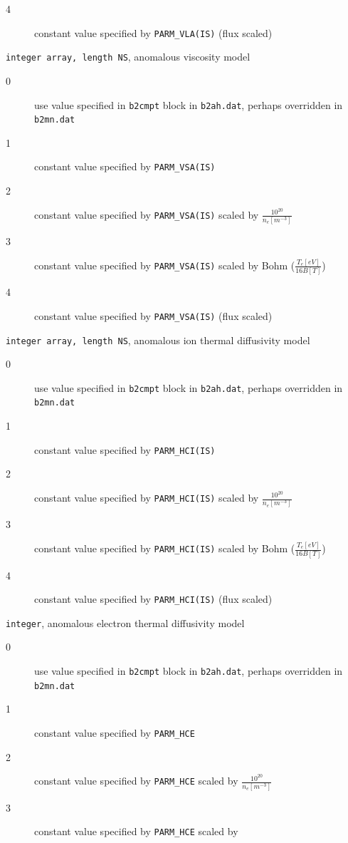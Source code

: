\documentclass[a4paper,10pt]{report}
\begin{document}
\begin{description}
\begin{description}
  \item[4] constant value specified by {\tt PARM\_VLA(IS)} (flux scaled)
  \end{description}
\item[FLAG\_VSA] {\tt integer array, length NS}, anomalous viscosity model
  \begin{description}
  \item[0] use value specified in {\tt b2cmpt} block in
  {\tt b2ah.dat}, perhaps overridden in {\tt b2mn.dat}
  \item[1] constant value specified by {\tt PARM\_VSA(IS)}
  \item[2] constant value specified by {\tt PARM\_VSA(IS)} scaled by
  $\frac{10^{20}}{n_e [m^{-3}]}$
  \item[3] constant value specified by {\tt PARM\_VSA(IS)} scaled by
  Bohm ($\frac{T_e [eV]}{16 B [T]}$)
  \item[4] constant value specified by {\tt PARM\_VSA(IS)} (flux scaled)
  \end{description}
\item[FLAG\_HCI] {\tt integer array, length NS}, anomalous ion thermal diffusivity model
  \begin{description}
  \item[0] use value specified in {\tt b2cmpt} block in
  {\tt b2ah.dat}, perhaps overridden in {\tt b2mn.dat}
  \item[1] constant value specified by {\tt PARM\_HCI(IS)}
  \item[2] constant value specified by {\tt PARM\_HCI(IS)} scaled by
  $\frac{10^{20}}{n_e [m^{-3}]}$
  \item[3] constant value specified by {\tt PARM\_HCI(IS)} scaled by
  Bohm ($\frac{T_e [eV]}{16 B [T]}$)
  \item[4] constant value specified by {\tt PARM\_HCI(IS)} (flux scaled)
  \end{description}
\item[FLAG\_HCE] {\tt integer}, anomalous electron thermal diffusivity model
  \begin{description}
  \item[0] use value specified in {\tt b2cmpt} block in
  {\tt b2ah.dat}, perhaps overridden in {\tt b2mn.dat}
  \item[1] constant value specified by {\tt PARM\_HCE}
  \item[2] constant value specified by {\tt PARM\_HCE} scaled by
  $\frac{10^{20}}{n_e [m^{-3}]}$
  \item[3] constant value specified by {\tt PARM\_HCE} scaled by

\end{description}
\end{description}
\end{document}
